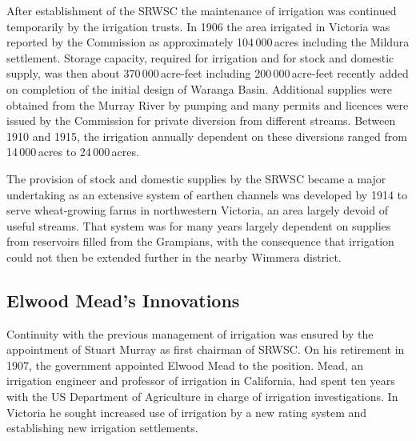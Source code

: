 After establishment of the SRWSC the maintenance of irrigation was
continued temporarily by the irrigation trusts.  In 1906 the area
irrigated in Victoria was reported by the Commission as approximately
104\,000\,acres including the Mildura settlement.  Storage capacity, required for irrigation and for stock and
domestic supply, was then about 370\,000\,acre-feet including
200\,000\,acre-feet recently added on completion of the initial design
of Waranga Basin.  Additional supplies were obtained from the Murray
River by pumping and many permits
and licences were issued by the Commission for private diversion from
different streams.  Between 1910 and 1915, the irrigation annually
dependent on these diversions ranged from 14\,000\,acres to
24\,000\,acres.

The provision of stock and domestic supplies by the SRWSC became a
major undertaking as an extensive system of earthen
channels was developed by 1914 to serve
wheat-growing farms in northwestern Victoria, an area
largely devoid of useful streams. That system was for many years
largely dependent on supplies from
reservoirs filled from the Grampians, with
the consequence that irrigation could not then be extended further in
the nearby Wimmera district.

\subsection*{Elwood Mead's Innovations}

Continuity with the previous management of irrigation was ensured by
the appointment of Stuart Murray \index{Murray, S.} as first chairman
of SRWSC.  On his retirement in 1907, the government appointed Elwood
Mead to the position.  Mead, an irrigation engineer and professor of
irrigation in \index{California}California, had spent ten years with
the US Department of Agriculture in charge of irrigation
investigations.  In Victoria he sought increased use of irrigation by
a new rating system and establishing new irrigation settlements.


